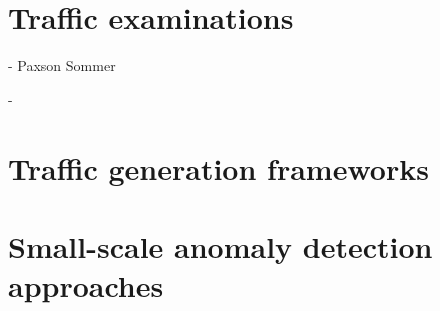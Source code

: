 
\section{Traffic examinations}

- Paxson Sommer


- 

\section{Traffic generation frameworks}

\section{Small-scale anomaly detection approaches}

